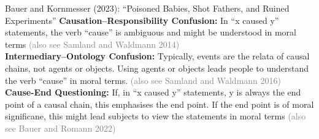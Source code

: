 \documentclass[xcolor=table,9pt,aspectratio=169]{beamer}
\begin{document}
\begin{frame}{\vspace*{10mm}Bauer and Kornmesser (2023): ``Poisoned Babies, Shot Fathers, and Ruined Experiments''}
\vspace*{-5mm}
\textbf{Causation--Responsibility Confusion:} In ``x caused y'' statements, the verb ``cause'' is ambiguous and might be understood in moral terms \textcolor{gray}{(also see Samland and Waldmann 2014)}\\
\vspace*{1em}
\textbf{Intermediary--Ontology Confusion:} Typically, events are the relata of causal chains, not agents or objects. Using agents or objects leads people to understand the verb ``cause'' in moral terms. \textcolor{gray}{(also see Samland and Waldmann 2016)}\\
\vspace*{1em}
\textbf{Cause-End Questioning:} If, in ``x caused y'' statements, y is always the end point of a causal chain, this emphasises the end point. If the end point is of moral significane, this might lead subjects to view the statements in moral terms \textcolor{gray}{(also see Bauer and Romann 2022)}\\
\vfill
{}
\end{frame}
\end{document}
